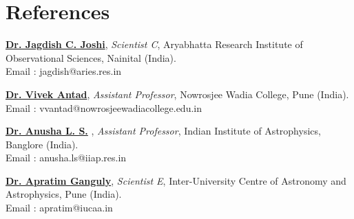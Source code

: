 \section{References}

     \begin{onecolentry}
         \href{https://inspirehep.net/authors/2075697}{\textbf{Dr. Jagdish C. Joshi}}, \textit{Scientist C}, Aryabhatta Research Institute of Observational Sciences, Nainital (India).\\
         Email : jagdish@aries.res.in
    \end{onecolentry}
    \vspace{0.2 cm}

    
    \begin{onecolentry}
        \href{https://scholar.google.com/citations?user=08cQ-HMAAAAJ&hl=en}{\textbf{Dr. Vivek Antad}}, \textit{Assistant Professor}, Nowrosjee Wadia College, Pune (India).\\
        Email : vvantad@nowrosjeewadiacollege.edu.in
    \end{onecolentry}

    \vspace{0.2 cm}
    
    \begin{onecolentry}
         \href{https://scholar.google.de/citations?user=WLxCXVUAAAAJ&hl=en}{\textbf{Dr. Anusha L. S.}}
        , \textit{Assistant Professor}, Indian Institute of Astrophysics, Banglore (India).\\
        Email : anusha.ls@iiap.res.in
    \end{onecolentry}

    \vspace{0.2 cm}
    
     \begin{onecolentry}
         \href{https://inspirehep.net/authors/1298756}{\textbf{Dr. Apratim Ganguly}}, \textit{Scientist E}, Inter-University Centre of Astronomy and Astrophysics, Pune (India).\\
         Email : apratim@iucaa.in
    \end{onecolentry}




